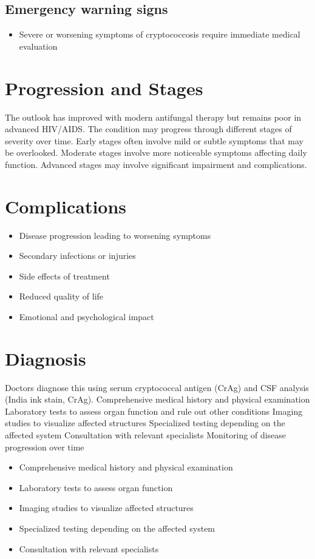 \subsection{Emergency warning signs}
\begin{itemize}[noitemsep]
  \item Severe or worsening symptoms of cryptococcosis require immediate medical evaluation
\end{itemize}
\section{Progression and Stages}
The outlook has improved with modern antifungal therapy but remains poor in advanced HIV/AIDS. The condition may progress through different stages of severity over time. Early stages often involve mild or subtle symptoms that may be overlooked. Moderate stages involve more noticeable symptoms affecting daily function. Advanced stages may involve significant impairment and complications.
\section{Complications}
\begin{itemize}[noitemsep]
  \item Disease progression leading to worsening symptoms
  \item Secondary infections or injuries
  \item Side effects of treatment
  \item Reduced quality of life
  \item Emotional and psychological impact
\end{itemize}
\section{Diagnosis}
Doctors diagnose this using serum cryptococcal antigen (CrAg) and CSF analysis (India ink stain, CrAg). Comprehensive medical history and physical examination Laboratory tests to assess organ function and rule out other conditions Imaging studies to visualize affected structures Specialized testing depending on the affected system Consultation with relevant specialists Monitoring of disease progression over time

\begin{itemize}[noitemsep]
  \item Comprehensive medical history and physical examination
  \item Laboratory tests to assess organ function
  \item Imaging studies to visualize affected structures
  \item Specialized testing depending on the affected system
  \item Consultation with relevant specialists
\end{itemize}
